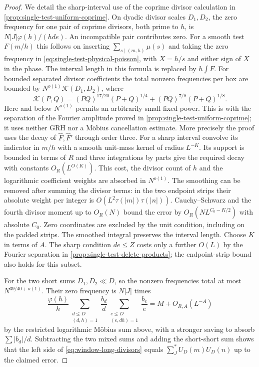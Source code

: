 \documentclass[11pt,a4paper]{article}
\numberwithin{equation}{section}
\begin{document}
\begin{proof}
We detail the sharp-interval use of the coprime divisor
calculation in \cref{prop:single-test-uniform-coprime}.
On dyadic divisor scales $D_1,D_2$, the zero frequency for
one pair of coprime divisors, both prime to $h$, is
$N|J|\varphi(h)/(hde)$. An incompatible pair contributes zero.
For a smooth test $F(m/h)$ this follows on inserting
$\sum_{s\mid(m,h)}\mu(s)$ and taking the zero frequency in
\cref{eq:single-test-physical-poisson}, with $X=h/s$ and either
sign of $X$ in the phase. The interval length in this formula is
replaced by $h\int F$. For bounded separated divisor coefficients
the total nonzero frequencies per box are bounded by
$N^{o(1)}\mathcal K(D_1,D_2)$, where
\[
 \mathcal K(P,Q)=(PQ)^{17/20}(P+Q)^{1/4}
                  +(PQ)^{7/8}(P+Q)^{1/8}.
\]
Here and below $N^{o(1)}$ permits an arbitrarily small fixed
power. This is \cite[Theorem~1]{BettinChandeeFractions} with the separation of the
Fourier amplitude proved in \cref{prop:single-test-uniform-coprime};
it uses neither GRH nor a M\"obius cancellation estimate. More
precisely the proof uses the decay of $\widehat F,\widehat F'$
through order three. For a sharp interval convolve its indicator
in $m/h$ with a smooth unit-mass kernel of radius $L^{-K}$.
Its support is bounded in terms of $R$ and three integrations by
parts give the required decay with constants $O_R(L^{O(K)})$.
This cost, the divisor count of $h$ and the logarithmic coefficient
weights are absorbed in $N^{o(1)}$. The smoothing can be removed
after summing the divisor terms: in the two endpoint strips their
absolute weight per integer is $O(L^2\tau(|m|)\tau(|n|))$.
Cauchy--Schwarz and the fourth divisor moment up to $O_R(N)$
bound the error by $O_R(NL^{C_0-K/2})$ with absolute $C_0$.
Zero coordinates are excluded by the unit condition, including
on the padded strips. The smoothed integral preserves the interval
length. Choose $K$ in terms of $A$. The sharp condition $de\le Z$
costs only a further $O(L)$ by the Fourier separation in
\cref{prop:single-test-delete-products}; the endpoint-strip
bound also holds for this subset.

For the two short sums $D_1,D_2\ll D$, so the nonzero
frequencies total at most $N^{39/40+o(1)}$. Their zero frequency
is $N|J|$ times
\[
 \frac{\varphi(h)}h\sum_{\substack{d\le D\\(d,h)=1}}\frac{b_d}{d}
       \sum_{\substack{e\le D\\(e,dh)=1}}\frac{b_e}{e}
       =M+O_{R,A}(L^{-A})
\]
by the restricted logarithmic M\"obius sum above, with a stronger
saving to absorb $\sum |b_d|/d$. Subtracting the two mixed sums
and adding the short-short sum shows that the left side of
\cref{eq:window-long-divisors} equals $\sum_J^*U_D(m)U_D(n)$
up to the claimed error.


\end{proof}
\end{document}
